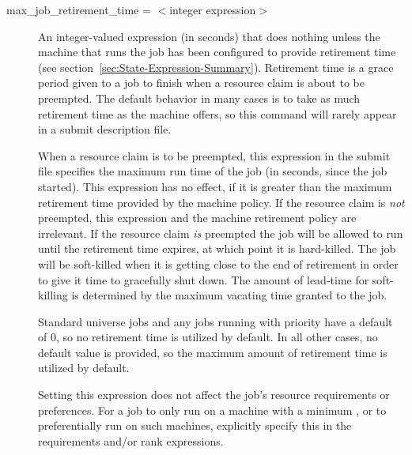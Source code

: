 \begin{description}

\label{condor-submit-max-job-retirement-time}
\item[max\_job\_retirement\_time = $<$integer expression$>$]
An integer-valued expression (in seconds) that
does nothing unless the machine that runs the job has been configured
to provide retirement time
(see section~\ref{sec:State-Expression-Summary}).
Retirement time is a
grace period given to a job to finish
when a resource claim is about to be preempted.
The default behavior in many cases is to take as much
retirement time as the machine offers,
so this command will rarely appear in a submit description file.

When a resource claim is to be preempted, this expression in the
submit file specifies the maximum run time of the job (in seconds, since
the job started).
This expression has no effect,
if it is greater than the maximum retirement time provided
by the machine policy.
If the resource claim is \emph{not} preempted,
this expression and the machine retirement policy are irrelevant. 
If the resource claim \emph{is} preempted
the job will be allowed to run until the retirement
time expires, at which point it is hard-killed.
The job will be soft-killed when it is getting close
to the end of retirement in order to give it time
to gracefully shut down.  The amount of lead-time
for soft-killing is determined by the maximum vacating
time granted to the job.

Standard universe jobs and any jobs running with 
priority have a default  of 0,
so no retirement time is utilized by default.
In all other cases,
no default value is provided,
so the maximum amount of retirement time is utilized by default.

Setting this expression does not affect the job's resource
requirements or preferences.  
For a job to only run on
a machine with a minimum ,
or to preferentially run on such machines, explicitly
specify this in the requirements and/or rank expressions.



\end{description}
